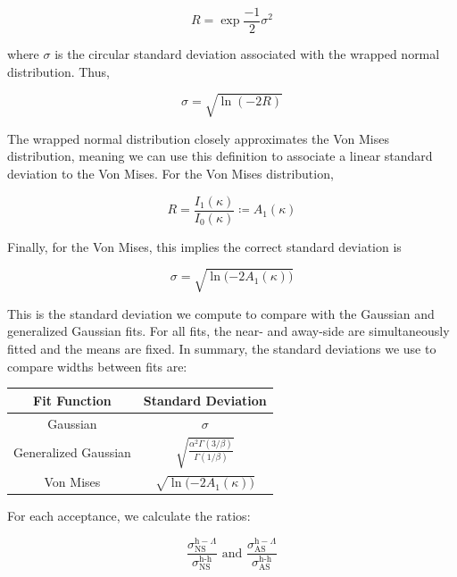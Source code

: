 \documentclass[../main.tex]{subfiles}
\begin{document}
\begin{equation}
    R = \exp{\frac{-1}{2}\sigma^2}
\end{equation}

where $\sigma$ is the circular standard deviation associated with the wrapped normal distribution. Thus, 

\begin{equation}
    \sigma = \sqrt{\ln{(-2 R)}}
    \label{eq:vonmiseswidth}
\end{equation}

The wrapped normal distribution closely approximates the Von Mises distribution, meaning we can use this definition to associate a linear standard deviation to the Von Mises. For the Von Mises distribution, 

\begin{equation}
    R = \frac{I_1(\kappa)}{I_0(\kappa)} \coloneq A_1(\kappa)
\end{equation}

Finally, for the Von Mises, this implies the correct standard deviation is 

\begin{equation}
    \sigma = \sqrt{\ln{(-2 A_1(\kappa)})}
\end{equation}


This is the standard deviation we compute to compare with the Gaussian and generalized Gaussian fits. For all fits, the near- and away-side are simultaneously fitted and the means are fixed. In summary, the standard deviations we use to compare widths between fits are:

\begin{center}
    \bgroup
    \def\arraystretch{1.5}
    \begin{tabular}{|c|c|} \hline
        Fit Function & Standard Deviation \\ 
        \hline
        Gaussian & $\sigma$ \\ 
        Generalized Gaussian & $\sqrt{\frac{\alpha^2 \Gamma(3/\beta)}{\Gamma(1/\beta)}}$ \\
        Von Mises & $\sqrt{\ln{(-2 A_1(\kappa)})}$ \\ 
        \hline
    \end{tabular}
    \egroup
\end{center}

For each acceptance, we calculate the ratios: 

\begin{equation}
    \frac{\sigma^{\text{h}-\Lambda}_\text{NS}}{\sigma^{\text{h-h}}_\text{NS}} \text{ and } \frac{\sigma^{\text{h}-\Lambda}_\text{AS}}{\sigma^{\text{h-h}}_\text{AS}}
\end{equation}
\end{document}
